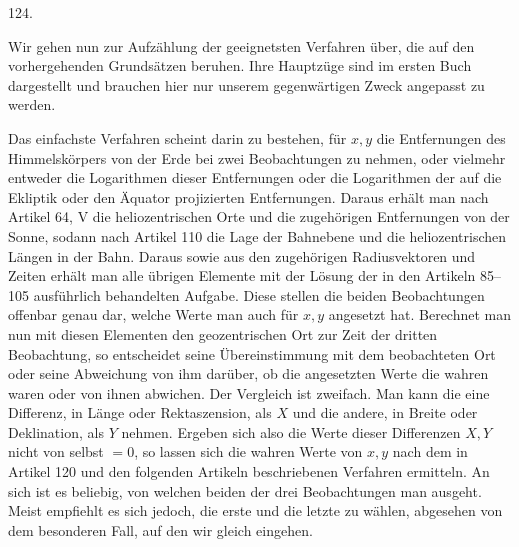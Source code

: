 \par{}\medskip
\begin{center}\hypertarget{native-171-article124}{}124.\end{center}
Wir gehen nun zur Aufzählung der geeignetsten Verfahren über, die auf den vorhergehenden Grundsätzen beruhen. Ihre Hauptzüge sind im ersten Buch dargestellt und brauchen hier nur unserem gegenwärtigen Zweck angepasst zu werden.

Das einfachste Verfahren scheint darin zu bestehen, für $x,y$ die Entfernungen des Himmelskörpers von der Erde bei zwei Beobachtungen zu nehmen, oder vielmehr entweder die Logarithmen dieser Entfernungen oder die Logarithmen der auf die Ekliptik oder den Äquator projizierten Entfernungen. Daraus erhält man nach Artikel 64, V die heliozentrischen Orte und die zugehörigen Entfernungen von der Sonne, sodann nach Artikel 110 die Lage der Bahnebene und die heliozentrischen Längen in der Bahn. Daraus sowie aus den zugehörigen Radiusvektoren und Zeiten erhält man alle übrigen Elemente mit der Lösung der in den Artikeln 85–105 ausführlich behandelten Aufgabe. Diese stellen die beiden Beobachtungen offenbar genau dar, welche Werte man auch für $x,y$ angesetzt hat. Berechnet man nun mit diesen Elementen den geozentrischen Ort zur Zeit der dritten Beobachtung, so entscheidet seine Übereinstimmung mit dem beobachteten Ort oder seine Abweichung von ihm darüber, ob die angesetzten Werte die wahren waren oder von ihnen abwichen. Der Vergleich ist zweifach. Man kann die eine Differenz, in Länge oder Rektaszension, als $X$ und die andere, in Breite oder Deklination, als $Y$ nehmen. Ergeben sich also die Werte dieser Differenzen $X,Y$ nicht von selbst $=0$, so lassen sich die wahren Werte von $x,y$ nach dem in Artikel 120 und den folgenden Artikeln beschriebenen Verfahren ermitteln. An sich ist es beliebig, von welchen beiden der drei Beobachtungen man ausgeht. Meist empfiehlt es sich jedoch, die erste und die letzte zu wählen, abgesehen von dem besonderen Fall, auf den wir gleich eingehen.


